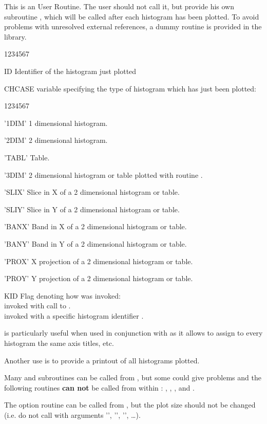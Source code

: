 \Action
This is an \HPLOT{} User Routine. The user should not call it, but provide his 
own subroutine , which will be called after each histogram has been
plotted. To avoid problems with unresolved external references, a dummy routine
 is provided in the \HPLOT{} library.
\Pdesc
\begin{DLtt}{1234567}
\item[ID]     Identifier of the histogram just plotted
\item[CHCASE] \CHARACTER{} variable specifying the type of histogram which has 
              just been plotted:
\begin{DLtt}{1234567}
\item['1DIM'] 1 dimensional histogram.
\item['2DIM'] 2 dimensional histogram.
\item['TABL'] Table.
\item['3DIM'] 2 dimensional histogram or table plotted with routine 
              .
\item['SLIX'] Slice in X of a 2 dimensional histogram or table.
\item['SLIY'] Slice in Y of a 2 dimensional histogram or table.
\item['BANX'] Band in X of a 2 dimensional histogram or table.
\item['BANY'] Band in Y of a 2 dimensional histogram or table.
\item['PROX'] X projection of a 2 dimensional histogram or table.
\item['PROY'] Y projection of a 2 dimensional histogram or table.
\end{DLtt}
\item[KID]    Flag denoting how  was invoked:\\
               invoked with call to .\\
               invoked with a specific histogram identifier .
\end{DLtt}
\Remarks
\begin{UL}
\item {} is particularly useful when used in conjunction with 
       as it allows to assign to every histogram the same axis
      titles, etc. 
\item Another use is to provide a printout of all histograms plotted.
\item Many \HBOOK{} and \HPLOT{} subroutines can be called from ,
      but some could give problems and the following routines {\bf can not} be
      called from within : , , 
      ,  and . 
\item The option routine  can be called from , but the
      plot size should not be changed (i.e. do not call  with 
      arguments '', '', '', \ldots).
\end{UL}

